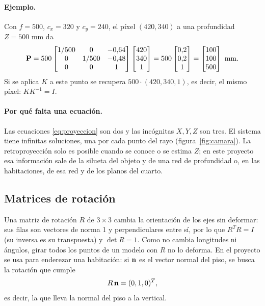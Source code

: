 \paragraph{Ejemplo.} Con $f=500$, $c_x=320$ y $c_y=240$, el píxel $(420,340)$
a una profundidad $Z=500$ mm da
\[
\mathbf{P} = 500\begin{bmatrix} 1/500 & 0 & -0{,}64\\ 0 & 1/500 & -0{,}48\\ 0&0&1\end{bmatrix}
\begin{bmatrix} 420\\ 340\\ 1\end{bmatrix}
= 500\begin{bmatrix} 0{,}2\\ 0{,}2\\ 1\end{bmatrix}
= \begin{bmatrix} 100\\ 100\\ 500\end{bmatrix}\text{ mm}.
\]
Si se aplica $K$ a este punto se recupera $500\cdot(420,340,1)$, es decir, el
mismo píxel: $KK^{-1}=I$.

\paragraph{Por qué falta una ecuación.} Las ecuaciones \eqref{eq:proyeccion}
son dos y las incógnitas $X,Y,Z$ son tres. El sistema tiene infinitas
soluciones, una por cada punto del rayo (figura~\ref{fig:camara}). La
retroproyección solo es posible cuando se conoce o se estima $Z$; en este
proyecto esa información sale de la silueta del objeto y de una red de
profundidad o, en las habitaciones, de esa red y de los planos del cuarto.

\subsection{Matrices de rotación}

Una matriz de rotación $R$ de $3\times3$ cambia la orientación de los ejes sin
deformar: sus filas son vectores de norma 1 y perpendiculares entre sí, por lo
que $R^{T}R=I$ (su inversa es su transpuesta) y $\det R=1$. Como no cambia
longitudes ni ángulos, girar todos los puntos de un modelo con $R$ no lo
deforma. En el proyecto se usa para enderezar una habitación: si $\mathbf{n}$ es
el vector normal del piso, se busca la rotación que cumple
\begin{equation}
R\,\mathbf{n} = (0,1,0)^{T},
\label{eq:enderezar}
\end{equation}
es decir, la que lleva la normal del piso a la vertical.

